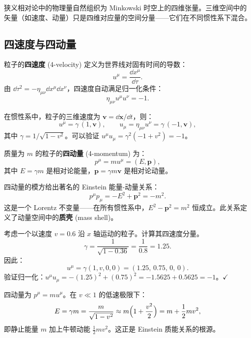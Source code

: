 狭义相对论中的物理量自然组织为 Minkowski 时空上的四维张量。三维空间中的矢量（如速度、动量）只是四维对应量的空间分量——它们在不同惯性系下混合。

\subsection{四速度与四动量}

\begin{definition}[四速度]
粒子的\textbf{四速度} (4-velocity) 定义为世界线对固有时间的导数：
\begin{equation}
    u^\mu = \frac{\dd x^\mu}{\dd\tau}.
\end{equation}
由 $\dd\tau^2 = -\eta_{\mu\nu}\dd x^\mu\dd x^\nu$，四速度自动满足归一化条件：
\begin{equation}\label{eq:u_normalization}
    \eta_{\mu\nu} u^\mu u^\nu = -1.
\end{equation}
\end{definition}

在惯性系中，粒子的三维速度为 $\mathbf{v} = \dd\mathbf{x}/\dd t$，则：
\begin{equation}\label{eq:4velocity_components}
    \boxed{u^\mu = \gamma\,(1, \mathbf{v})}, \qquad u_\mu = \eta_{\mu\nu} u^\nu = \gamma\,(-1, \mathbf{v}),
\end{equation}
其中 $\gamma = 1/\sqrt{1 - v^2}$。可以验证 $u^\mu u_\mu = \gamma^2(-1 + v^2) = -1$。

\begin{definition}[四动量]
质量为 $m$ 的粒子的\textbf{四动量} (4-momentum) 为：
\begin{equation}
    p^\mu = m u^\mu = (E, \mathbf{p}),
\end{equation}
其中 $E = \gamma m$ 是相对论能量，$\mathbf{p} = \gamma m \mathbf{v}$ 是相对论动量。
\end{definition}

\begin{property}[质壳条件]
四动量的模方给出著名的 Einstein 能量-动量关系：
\begin{equation}\label{eq:mass_shell}
    \boxed{p^\mu p_\mu = -E^2 + \mathbf{p}^2 = -m^2}.
\end{equation}
这是一个 Lorentz 不变量——在所有惯性系中，$E^2 - \mathbf{p}^2 = m^2$ 恒成立。此关系定义了动量空间中的\textbf{质壳} (mass shell)。
\end{property}

\begin{example}[四速度分量的计算]
考虑一个以速度 $v = 0.6$ 沿 $x$ 轴运动的粒子。计算其四速度分量。
\[
\gamma = \frac{1}{\sqrt{1 - 0.36}} = \frac{1}{0.8} = 1.25.
\]
因此：
\[
u^\mu = \gamma(1, v, 0, 0) = (1.25,\, 0.75,\, 0,\, 0).
\]
验证归一化：$u^\mu u_\mu = -(1.25)^2 + (0.75)^2 = -1.5625 + 0.5625 = -1$。\hfill $\checkmark$

四动量为 $p^\mu = m u^\mu$。在 $v \ll 1$ 的低速极限下：
\[
E = \gamma m = \frac{m}{\sqrt{1 - v^2}} \approx m\Bigl(1 + \frac{v^2}{2}\Bigr) = m + \frac{1}{2}mv^2,
\]
即静止能量 $m$ 加上牛顿动能 $\frac{1}{2}mv^2$。这正是 Einstein 质能关系的根源。
\end{example}

